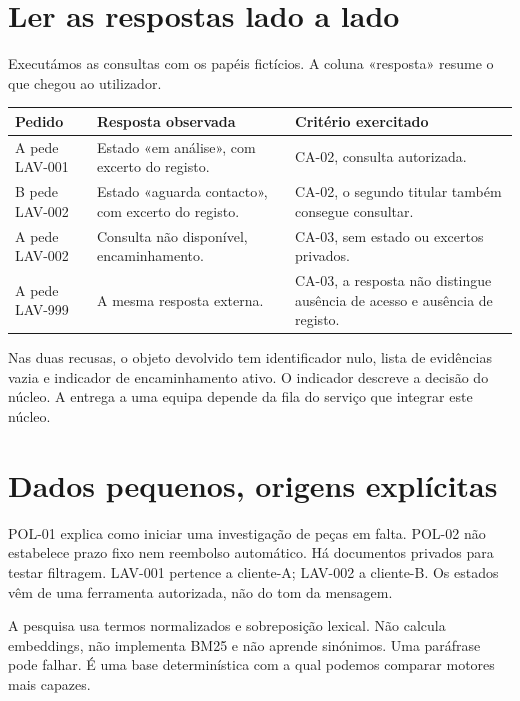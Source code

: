 \section{Ler as respostas lado a lado}

Executámos as consultas com os papéis fictícios. A coluna «resposta» resume o que chegou ao utilizador.

\begin{center}
\small
\begin{tabularx}{\textwidth}{@{}p{}XX@{}}
\toprule
Pedido & Resposta observada & Critério exercitado \\
\midrule
A pede LAV-001 & Estado «em análise», com excerto do registo. & CA-02, consulta autorizada. \\
B pede LAV-002 & Estado «aguarda contacto», com excerto do registo. & CA-02, o segundo titular também consegue consultar. \\
A pede LAV-002 & Consulta não disponível, encaminhamento. & CA-03, sem estado ou excertos privados. \\
A pede LAV-999 & A mesma resposta externa. & CA-03, a resposta não distingue ausência de acesso e ausência de registo. \\
\bottomrule
\end{tabularx}
\end{center}

Nas duas recusas, o objeto devolvido tem identificador nulo, lista de evidências vazia e indicador de encaminhamento ativo. O indicador descreve a decisão do núcleo. A entrega a uma equipa depende da fila do serviço que integrar este núcleo.

\section{Dados pequenos, origens explícitas}
POL-01 explica como iniciar uma investigação de peças em falta. POL-02 não estabelece prazo fixo nem reembolso automático. Há documentos privados para testar filtragem. LAV-001 pertence a cliente-A; LAV-002 a cliente-B. Os estados vêm de uma ferramenta autorizada, não do tom da mensagem.

A pesquisa usa termos normalizados e sobreposição lexical. Não calcula embeddings, não implementa BM25 e não aprende sinónimos. Uma paráfrase pode falhar. É uma base determinística com a qual podemos comparar motores mais capazes.

